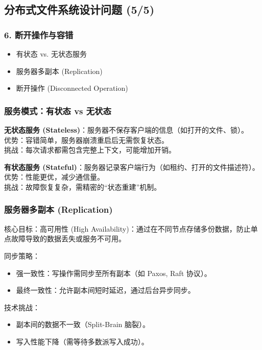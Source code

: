 \subsection{分布式文件系统设计问题 (5/5)}

\subsubsection{6. 断开操作与容错}
\begin{itemize}
    \item 有状态 vs. 无状态服务
    \item 服务器多副本 (Replication)
    \item 断开操作 (Disconnected Operation)
\end{itemize}

\subsubsection{服务模式：有状态 vs 无状态}

\textbf{无状态服务 (Stateless)}：服务器不保存客户端的信息（如打开的文件、锁）。\\
优势：容错简单，服务器崩溃重启后无需恢复状态。\\
挑战：每次请求都需包含完整上下文，可能增加开销。

\textbf{有状态服务 (Stateful)}：服务器记录客户端行为（如租约、打开的文件描述符）。\\
优势：性能更优，减少通信量。\\
挑战：故障恢复复杂，需精密的“状态重建”机制。

\subsubsection{服务器多副本 (Replication)}
核心目标：高可用性 (High Availability)：通过在不同节点存储多份数据，防止单点故障导致的数据丢失或服务不可用。

同步策略：
\begin{itemize}
    \item 强一致性：写操作需同步至所有副本（如 Paxos, Raft 协议）。
    \item 最终一致性：允许副本间短时延迟，通过后台异步同步。
\end{itemize}

技术挑战：
\begin{itemize}
    \item 副本间的数据不一致（Split-Brain 脑裂）。
    \item 写入性能下降（需等待多数派写入成功）。
\end{itemize}

